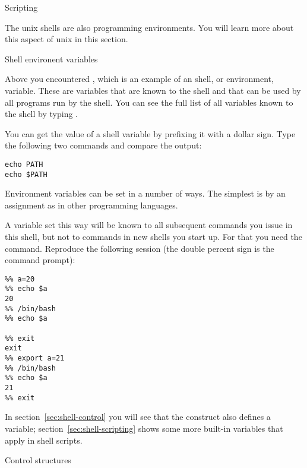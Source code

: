  {Scripting}
\label{sec:unix-script}

The unix shells are also programming environments. You will learn more
about this aspect of unix in this section.

 {Shell environent variables}

Above you encountered , which is an example of an
shell, or environment, variable. These are variables that are known to the shell
and that can be used by all programs run by the shell. You can see the
full list of all variables known to the shell by typing . 

You can get the value of a shell variable by prefixing it with
a dollar sign. Type the following two commands and compare the output:
\begin{verbatim}
echo PATH
echo $PATH
\end{verbatim}


Environment variables can be set in a number of ways. The simplest
is by an assignment as in other programming languages.


A variable set this way will be known to all subsequent commands
you issue in this shell, but not to commands in new shells you start up.
For that you need the  command.
Reproduce the following session (the double percent sign is the command
prompt):
\begin{verbatim}
%% a=20
%% echo $a
20
%% /bin/bash
%% echo $a

%% exit
exit
%% export a=21
%% /bin/bash
%% echo $a
21
%% exit
\end{verbatim}

In  section~\ref{sec:shell-control} you will see that the  construct
also defines a variable; section~\ref{sec:shell-scripting}
shows some more built-in variables that apply in shell scripts.


 {Control structures}
\label{sec:shell-control}

